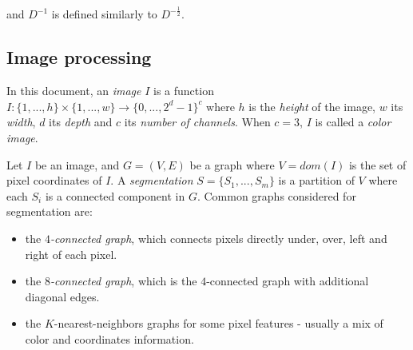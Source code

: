 and $D^{-1}$ is defined similarly to $D^{-\frac{1}{2}}$.

\subsection{Image processing}
In this document, an \emph{image} $I$ is a function $I : \{1, ..., h\} \times \{1, ..., w\} \rightarrow \{0, ..., 2^d - 1\}^c$ where $h$ is the \emph{height} of the image, $w$ its \emph{width}, $d$ its \emph{depth} and $c$ its \emph{number of channels}. When $c = 3$, $I$ is called a \emph{color image}.

Let $I$ be an image, and $G = (V,E)$ be a graph where $V = dom(I)$ is the set of pixel coordinates of $I$. A \emph{segmentation} $S = \{S_1, ..., S_m\}$ is a partition of $V$ where each $S_i$ is a connected component in $G$. Common graphs considered for segmentation are:

\begin{itemize}
\item the \emph{$4$-connected graph}, which connects pixels directly under, over, left and right of each pixel.
\item the \emph{$8$-connected graph}, which is the $4$-connected graph with additional diagonal edges.
\item the $K$-nearest-neighbors graphs for some pixel features - usually a mix of color and coordinates information.
\end{itemize}